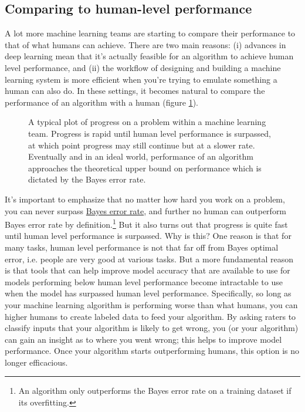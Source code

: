 \documentclass[12pt]{article}
\begin{document}
\subsection{Comparing to human-level performance}
A lot more machine learning teams are starting to compare their performance to that of what humans can achieve.
There are two main reasons: (i) advances in deep learning mean that it's actually feasible for an algorithm to
achieve human level performance, and (ii) the workflow of designing and building a machine learning system is more 
efficient when you're trying to emulate something a human can also do. In these settings, it becomes natural to compare the performance of an algorithm with a human (figure \ref{fig: progress-over-time}).
\begin{figure}[h]
  \centering   {}
  \label{fig: progress-over-time}
  \caption{A typical plot of progress on a problem within a machine learning team. Progress is rapid until
    human level performance is surpassed, at which point progress may still continue but at a slower rate.
    Eventually and in an ideal world, performance of an algorithm approaches the theoretical upper bound on 
    performance which is dictated by the Bayes error rate.} \end{figure}

It's important to emphasize that no matter how hard you work on a problem, you can never surpass \href{https://en.wikipedia.org/wiki/Bayes_error_rate}{Bayes error rate}, and further no human can outperform Bayes error 
rate by definition.\footnote{An algorithm only outperforms the Bayes error rate on a training dataset if its overfitting.}
But it also turns out that progress is quite fast until human level performance is surpassed. Why is this?  One reason
is that for many tasks, human level performance is not that far off from Bayes optimal error, i.e. people are very 
good at various tasks. But a more fundamental reason is that tools that can help improve model accuracy that are available to use for models performing below human level performance become intractable to use when the model has surpassed human level performance. Specifically, so long as your machine learning algorithm is performing worse than what humans, you can higher humans to create labeled data to feed your algorithm. By asking raters to classify inputs that your
algorithm is likely to get wrong, you (or your algorithm) can gain an insight as to where you went wrong; this helps
to improve model performance. Once your algorithm starts outperforming humans, this option is no longer efficacious.
\end{document}
